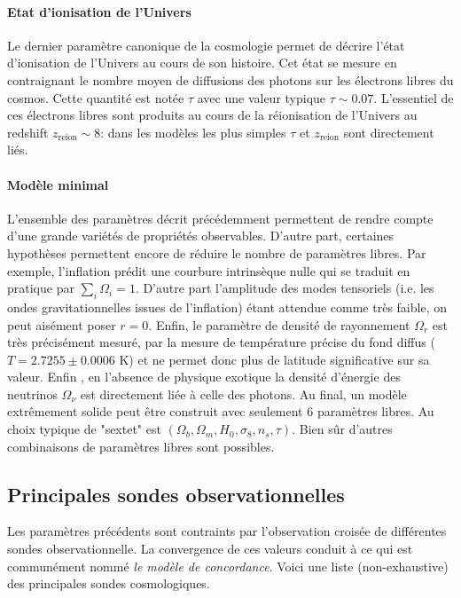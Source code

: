 \paragraph{Etat d'ionisation de l'Univers} Le dernier paramètre canonique de la cosmologie permet de décrire l'état d'ionisation de l'Univers au cours de son histoire. Cet état se mesure en  contraignant le nombre moyen de diffusions des photons sur les électrons libres du cosmos. Cette quantité est notée $\tau$ avec une valeur typique $\tau \sim 0.07$. L'essentiel de ces électrons libres sont produits au cours de la réionisation de l'Univers au redshift $z_\mathrm{reion}\sim 8$: dans les modèles les plus simples $\tau$ et $z_\mathrm{reion}$ sont directement liés.

\paragraph{Modèle minimal} L'ensemble des paramètres décrit précédemment permettent de rendre compte d'une grande variétés de propriétés observables. D'autre part, certaines hypothèses permettent encore de réduire le nombre de paramètres libres. Par exemple, l'inflation prédit une courbure intrinsèque nulle qui se traduit en pratique par $\sum_i \Omega_i=1$. D'autre part l'amplitude des modes tensoriels (i.e. les ondes gravitationnelles issues de l'inflation) étant attendue comme très faible, on peut aisément poser $r=0$. Enfin, le paramètre de densité de rayonnement $\Omega_r$ est très précisément mesuré, par la mesure de température précise du fond diffus ($T=2.7255\pm0.0006$ K) et ne permet donc plus de latitude significative sur sa valeur. Enfin , en l'absence de physique exotique la densité d'énergie des neutrinos $\Omega_\nu$ est directement liée à celle des photons. Au final, un modèle extrêmement solide peut être construit avec seulement 6 paramètres libres. Au choix typique de "sextet" est $(\Omega_b,\Omega_m, H_0,\sigma_8,n_s,\tau)$. Bien sûr d'autres combinaisons de paramètres libres sont possibles.

\subsection{Principales sondes observationnelles}

Les paramètres précédents sont contraints par l'observation croisée de différentes sondes observationnelle. La convergence de ces valeurs conduit à ce qui est communément nommé \textit{le modèle de concordance}. Voici une liste (non-exhaustive) des principales sondes cosmologiques.

